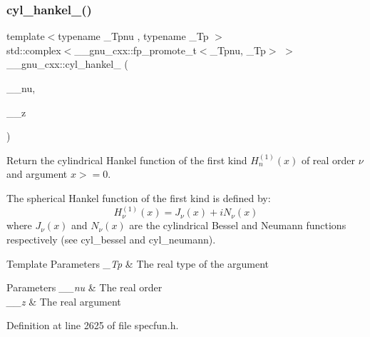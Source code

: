 \subsubsection{\texorpdfstring{cyl\+\_\+hankel\+\_()}{cyl\_hankel\_1()}\hspace{0.1cm}{\footnotesize\ttfamily [1/2]}}
{\footnotesize\ttfamily template$<$typename \+\_\+\+Tpnu , typename \+\_\+\+Tp $>$ \\
std\+::complex$<$\+\_\+\+\_\+gnu\+\_\+cxx\+::fp\+\_\+promote\+\_\+t$<$\+\_\+\+Tpnu, \+\_\+\+Tp$>$ $>$ \+\_\+\+\_\+gnu\+\_\+cxx\+::cyl\+\_\+hankel\+\_ (\begin{DoxyParamCaption}\item[{\+\_\+\+Tpnu}]{\+\_\+\+\_\+nu,  }\item[{\+\_\+\+Tp}]{\+\_\+\+\_\+z }\end{DoxyParamCaption})\hspace{0.3cm}{\ttfamily [inline]}}

Return the cylindrical Hankel function of the first kind $ H^{(1)}_n(x) $ of real order $ \nu $ and argument $ x >= 0 $.

The spherical Hankel function of the first kind is defined by\+: \[ H^{(1)}_\nu(x) = J_\nu(x) + iN_\nu(x) \] where $ J_\nu(x) $ and $ N_\nu(x) $ are the cylindrical Bessel and Neumann functions respectively (see cyl\+\_\+bessel and cyl\+\_\+neumann).


\begin{DoxyTemplParams}{Template Parameters}
{\em \+\_\+\+Tp} & The real type of the argument \\
\hline
\end{DoxyTemplParams}

\begin{DoxyParams}{Parameters}
{\em \+\_\+\+\_\+nu} & The real order \\
\hline
{\em \+\_\+\+\_\+z} & The real argument \\
\hline
\end{DoxyParams}


Definition at line 2625 of file specfun.\+h.

\mbox{\label{group__gnu__math__spec__func_ga2f111212d3ec713625acb6986daa925f}} 
